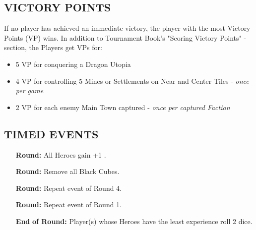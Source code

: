 \begin{multicols*}{2}
\subsection*{\MakeUppercase{Victory Points}}
If no player has achieved an immediate victory, the player with the most Victory Points (VP) wins. In addition to Tournament Book's "Scoring Victory Points" -section, the Players get VPs for:

\begin{itemize}
 \item 5 VP for conquering a Dragon Utopia
 \item 4 VP for controlling 5 Mines or Settlements on Near and Center Tiles - \textit{once per game}
 \item 2 VP for each enemy Main Town captured - \textit{once per captured Faction}
\end{itemize}

\subsection*{\MakeUppercase{Timed Events}}

\begin{itemize}
  \item[\textbf{\nth{1}}] \textbf{Round:} All Heroes gain +1 .
  \item[\textbf{\nth{4}}] \textbf{Round:} Remove all Black Cubes. %
  \item[\textbf{\nth{8}}] \textbf{Round:} Repeat event of Round 4.
  \item[\textbf{\nth{9}}] \textbf{Round:} Repeat event of Round 1.
  \item[\textbf{End}] \textbf{of  Round:} Player(s) whose Heroes have the least experience roll 2  dice.
\end{itemize}


\end{multicols*}
